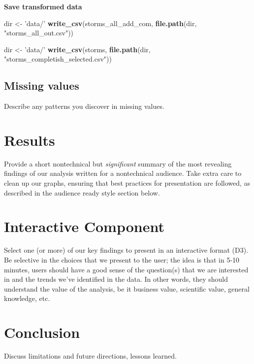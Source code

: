 \documentclass[]{book}
\newenvironment{Shaded}{\begin{snugshade}}{\end{snugshade}}
\newcommand{\KeywordTok}[1]{\textcolor[rgb]{0.13,0.29,0.53}{\textbf{#1}}}
\newcommand{\NormalTok}[1]{#1}
\newcommand{\StringTok}[1]{\textcolor[rgb]{0.31,0.60,0.02}{#1}}
\begin{document}
\textbf{Save transformed data}

\begin{Shaded}
\begin{Highlighting}[]
\NormalTok{dir <-}\StringTok{ 'data/'}
\KeywordTok{write_csv}\NormalTok{(storms_all_add_com, }\KeywordTok{file.path}\NormalTok{(dir, }\StringTok{"storms_all_out.csv"}\NormalTok{))}
\end{Highlighting}
\end{Shaded}

\begin{Shaded}
\begin{Highlighting}[]
\NormalTok{dir <-}\StringTok{ 'data/'}
\KeywordTok{write_csv}\NormalTok{(storms, }\KeywordTok{file.path}\NormalTok{(dir, }\StringTok{"storms_completish_selected.csv"}\NormalTok{))}
\end{Highlighting}
\end{Shaded}

\hypertarget{missing-values}{%
\section{Missing values}\label{missing-values}}

Describe any patterns you discover in missing values.

\hypertarget{results}{%
\chapter{Results}\label{results}}

Provide a short nontechnical but \emph{significant} summary of the most revealing findings of our analysis written for a nontechnical audience. Take extra care to clean up our graphs, ensuring that best practices for presentation are followed, as described in the audience ready style section below.

\hypertarget{interactive-component}{%
\chapter{Interactive Component}\label{interactive-component}}

Select one (or more) of our key findings to present in an interactive format (D3). Be selective in the choices that we present to the user; the idea is that in 5-10 minutes, users should have a good sense of the question(s) that we are interested in and the trends we've identified in the data. In other words, they should understand the value of the analysis, be it business value, scientific value, general knowledge, etc.

\hypertarget{conclusion}{%
\chapter{Conclusion}\label{conclusion}}

Discuss limitations and future directions, lessons learned.


\end{document}
